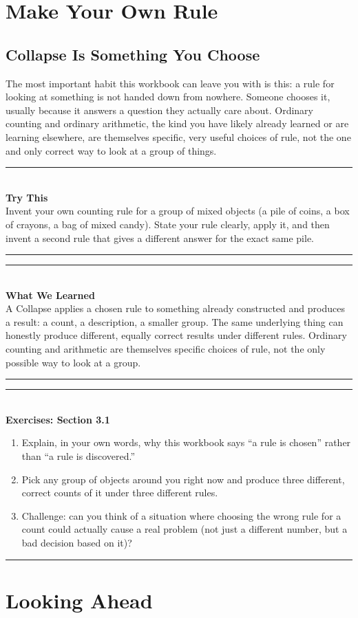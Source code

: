 \documentclass[11pt]{book}
\newenvironment{exercisebox}[1]{\vspace{0.8em}\noindent\rule{\linewidth}{0.6pt}\\[0.2em]\textbf{Exercises: #1}\\[0.3em]\begin{enumerate}[label=\arabic*., itemsep=0.4em]}{\end{enumerate}\noindent\rule{\linewidth}{0.6pt}\vspace{0.6em}}
\newenvironment{trythis}{\vspace{0.6em}\noindent\rule{\linewidth}{0.6pt}\\[0.2em]\textbf{Try This}\\[0.3em]}{\\[0.2em]\noindent\rule{\linewidth}{0.6pt}\vspace{0.6em}}
\newenvironment{summarybox}{\vspace{0.6em}\noindent\rule{\linewidth}{0.6pt}\\[0.2em]\textbf{What We Learned}\\[0.3em]}{\\[0.2em]\noindent\rule{\linewidth}{0.6pt}\vspace{0.6em}}
\begin{document}
\chapter{Make Your Own Rule}

\section{Collapse Is Something You Choose}

The most important habit this workbook can leave you with is this: a rule for looking at something is not handed down from nowhere. Someone chooses it, usually because it answers a question they actually care about. Ordinary counting and ordinary arithmetic, the kind you have likely already learned or are learning elsewhere, are themselves specific, very useful choices of rule, not the one and only correct way to look at a group of things.

\begin{trythis}
Invent your own counting rule for a group of mixed objects (a pile of coins, a box of crayons, a bag of mixed candy). State your rule clearly, apply it, and then invent a second rule that gives a different answer for the exact same pile.
\end{trythis}

\begin{summarybox}
A Collapse applies a chosen rule to something already constructed and produces a result: a count, a description, a smaller group. The same underlying thing can honestly produce different, equally correct results under different rules. Ordinary counting and arithmetic are themselves specific choices of rule, not the only possible way to look at a group.
\end{summarybox}

\begin{exercisebox}{Section 3.1}
\item Explain, in your own words, why this workbook says ``a rule is chosen'' rather than ``a rule is discovered.''
\item Pick any group of objects around you right now and produce three different, correct counts of it under three different rules.
\item Challenge: can you think of a situation where choosing the wrong rule for a count could actually cause a real problem (not just a different number, but a bad decision based on it)?
\end{exercisebox}

\chapter*{Looking Ahead}
\end{document}
